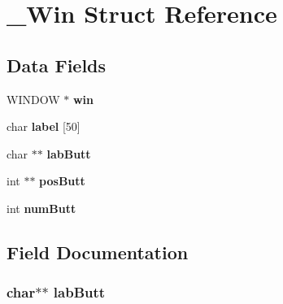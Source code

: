 \hypertarget{struct___win}{}\section{\+\_\+\+Win Struct Reference}
\label{struct___win}
\subsection*{Data Fields}
\begin{DoxyCompactItemize}
\item 
W\+I\+N\+D\+OW $\ast$ {\bfseries win}\hypertarget{struct___win_a09d962b38c0d24e36078d717d2a6ed96}{}\label{struct___win_a09d962b38c0d24e36078d717d2a6ed96}

\item 
char {\bfseries label} \mbox{[}50\mbox{]}\hypertarget{struct___win_a80059d6954dd5c12e38fd5cafe1a16cc}{}\label{struct___win_a80059d6954dd5c12e38fd5cafe1a16cc}

\item 
char $\ast$$\ast$ {\bfseries lab\+Butt}\hypertarget{struct___win_aff6ffec032f54ef65d0b880416f8246d}{}\label{struct___win_aff6ffec032f54ef65d0b880416f8246d}

\item 
int $\ast$$\ast$ {\bfseries pos\+Butt}\hypertarget{struct___win_a6d6060115df541c075d8f529a1511d26}{}\label{struct___win_a6d6060115df541c075d8f529a1511d26}

\item 
int {\bfseries num\+Butt}\hypertarget{struct___win_a1910eef8db510628192f27b24cdd0eb2}{}\label{struct___win_a1910eef8db510628192f27b24cdd0eb2}

\end{DoxyCompactItemize}


\subsection{Field Documentation}
\subsubsection[{\texorpdfstring{lab\+Butt}{labButt}}]{\setlength{\rightskip}{0pt plus 5cm}char$\ast$$\ast$ lab\+Butt}\hypertarget{struct___win_aff6ffec032f54ef65d0b880416f8246d}{}\label{struct___win_aff6ffec032f54ef65d0b880416f8246d}
